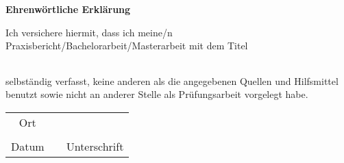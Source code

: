 \begin{centering}
\textbf{{\huge Ehrenwörtliche Erklärung}}
\par
\end{centering}

\vspace{2cm}

Ich versichere hiermit, dass ich meine/n Praxisbericht/Bachelorarbeit/Masterarbeit mit dem Titel

\vspace{2cm}

\begin{tabular*}{\linewidth}{@{\extracolsep{\fill}}ccc}
 \\ \hline
 \vspace{2cm}
 \\ \hline
\end{tabular*}

\vspace{2cm}

selbständig verfasst, keine anderen als die angegebenen Quellen und Hilfsmittel benutzt sowie nicht an anderer Stelle als Prüfungsarbeit vorgelegt habe.

\vfill

\begin{tabular}{ccc}
\cline{1-1}
\parbox{7cm}{\raggedright Ort} &
\parbox{3cm}{\raggedright} &
\parbox{7cm}{\raggedright} \\
\vspace{2.5cm} \\
 
\parbox{7cm}{\raggedright Datum} &
\parbox{3cm}{\raggedright} &
\parbox{7cm}{\raggedright Unterschrift} \\ 
\end{tabular}